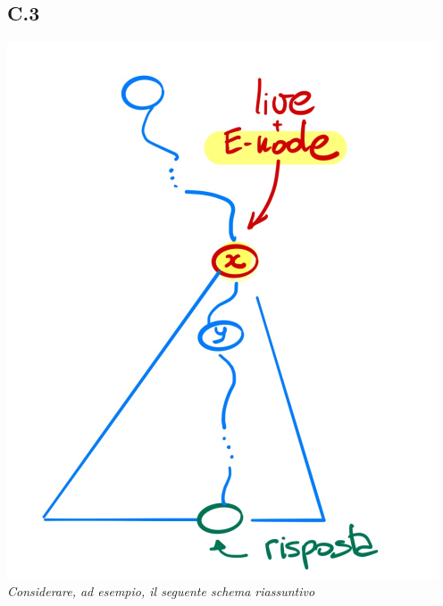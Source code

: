 \documentclass[a4paper]{article}
\begin{document}
\subsection{C.3}
\label{SEC:C3}
\includegraphics[width=\textwidth]{./img/C3.png}
\emph{Considerare, ad esempio, il seguente schema riassuntivo}
\end{document}
